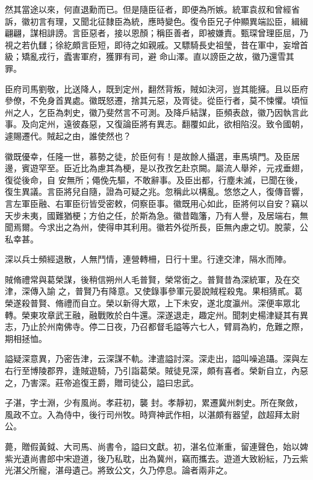 \begin{pinyinscope}
 然其當途以來，何直退勳而已。但是隨臣征者，即便為所嫉。統軍袁叔和曾經省訴，徽初言有理，又聞北征隸臣為統，應時變色。復令臣兄子仲顯異端訟臣，緝緝翩翩，謀相誹謗。言臣惡者，接以恩顏；稱臣善者，即被嫌責。甄琛曾理臣屈，乃視之若仇讎；徐紇頗言臣短，即待之如親戚。又驃騎長史祖瑩，昔在軍中，妄增首級；矯亂戎行，蠹害軍府，獲罪有司，避
 命山澤。直以謗臣之故，徽乃還雪其罪。



 臣府司馬劉敬，比送降人，既到定州，翻然背叛，賊如決河，豈其能擁。且以臣府參僚，不免身首異處。徽既怒遷，捨其元惡，及胥徒。從臣行者，莫不悚懼。頃恒州之人，乞臣為刺史，徽乃斐然言不可測。及降戶結謀，臣頻表啟，徽乃因執言此事。及向定州，遠彼姦惡，又復論臣將有異志。翻覆如此，欲相陷沒。致令國朝，遽賜遷代。賊起之由，誰使然也？



 徽既優幸，任隆一世，慕勢之徒，於臣何有！是故餘人攝選，車馬填門。及臣居邊，賓遊罕至。臣近比為慮其為梗，是以孜孜乞赴京闕。屬流人舉斧，元戎垂翅，復從後命，自
 安無所；僶俛先驅，不敢辭事。及臣出都，行塵未滅，已聞在後，復生異議。言臣將兒自隨，證為可疑之兆。忽稱此以構亂。悠悠之人，復傳音響，言左軍臣融、右軍臣衍皆受密敕，伺察臣事。徽既用心如此，臣將何以自安？竊以天步未夷，國難猶梗；方伯之任，於斯為急。徽昔臨籓，乃有人譽，及居端右，無聞焉爾。今求出之為州，使得申其利用。徽若外從所長，臣無內慮之切。脫蒙，公私幸甚。



 深以兵士頻經退散，人無鬥情，連營轉柵，日行十里。行達交津，隔水而陣。



 賊脩禮常與葛榮謀，後稍信朔州人毛普賢，榮常銜之。普賢昔為深統軍，及在交津，深傳入諭
 之，普賢乃有降意。又使錄事參軍元晏說賊程殺鬼。果相猜貳。葛榮遂殺普賢、脩禮而自立。榮以新得大眾，上下未安，遂北度瀛州。深便率眾北轉。榮東攻章武王融，融戰敗於白牛還。深遂退走，趣定州。聞刺史楊津疑其有異志，乃止於州南佛寺。停二日夜，乃召都督毛謚等六七人，臂肩為約，危難之際，期相拯恤。



 謚疑深意異，乃密告津，云深謀不軌。津遣謚討深。深走出，謚叫噪追躡。深與左右行至博陵郡界，逢賊遊騎，乃引詣葛榮。賊徒見深，頗有喜者。榮新自立，內惡之，乃害深。莊帝追復王爵，贈司徒公，謚曰忠武。



 子湛，字士淵，少有風尚。孝莊初，襲
 封。孝靜初，累遷冀州刺史。所在聚斂，風政不立。入為侍中，後行司州牧。時齊神武作相，以湛頗有器望，啟超拜太尉公。



 薨，贈假黃鉞、大司馬、尚書令，謚曰文獻。初，湛名位漸重，留連聲色，始以婢紫光遺尚書郎中宋遊道，後乃私耽，出為冀州，竊而攜去。遊道大致紛紜，乃云紫光湛父所寵，湛母遺己。將致公文，久乃停息。論者兩非之。




\end{pinyinscope}
